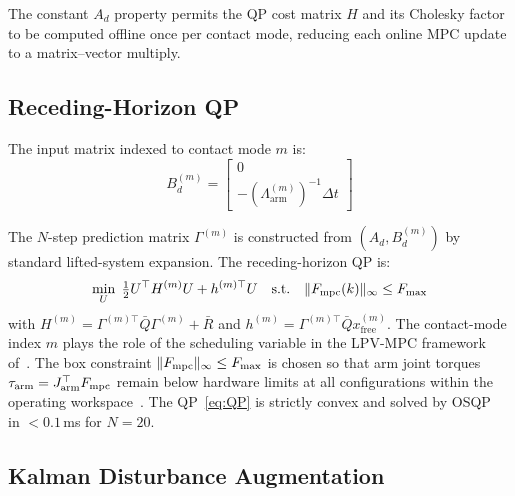 The constant $A_d$ property permits the QP cost matrix $H$ and its Cholesky
factor to be computed offline once per contact mode, reducing each online
MPC update to a matrix--vector multiply.

\subsection{Receding-Horizon QP}

The input matrix indexed to contact mode $m$ is:
\begin{equation}\label{eq:Bd}
  B_d^{(m)} = \begin{bmatrix}0 \\ -(\Lambda_{\text{arm}}^{(m)})^{-1}\Delta t\end{bmatrix}
\end{equation}

The $N$-step prediction matrix $\Gamma^{(m)}$ is constructed from
$(A_d,B_d^{(m)})$ by standard lifted-system expansion.
The receding-horizon QP is:
\begin{equation}\label{eq:QP}
  \min_{U}\;\tfrac{1}{2}U^\top H^{(m)}U + h^{(m)\top}U
  \quad\text{s.t.}\quad \|F_{\text{mpc}}(k)\|_\infty\leq F_{\max}
\end{equation}
with $H^{(m)}=\Gamma^{(m)\top}\bar{Q}\Gamma^{(m)}+\bar{R}$ and
$h^{(m)}=\Gamma^{(m)\top}\bar{Q}x_{\text{free}}^{(m)}$.
The contact-mode index $m$ plays the role of the scheduling variable in the
LPV-MPC framework of~\cite{cao2005minmax}.
The box constraint $\|F_{\text{mpc}}\|_\infty\leq F_{\max}$ is chosen so that arm
joint torques $\tau_{\text{arm}}=J_{\text{arm}}^\top F_{\text{mpc}}$ remain below
hardware limits at all configurations within the operating
workspace~\cite{cao2002antiwindup}.
The QP~\eqref{eq:QP} is strictly convex and solved by OSQP~\cite{stellato2020osqp}
in $<0.1$\,ms for $N=20$.

\subsection{Kalman Disturbance Augmentation}

